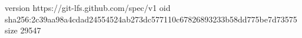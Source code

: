 version https://git-lfs.github.com/spec/v1
oid sha256:2c39aa98a4cdad24554524ab273dc577110c67826893233b58dd775be7d73575
size 29547
